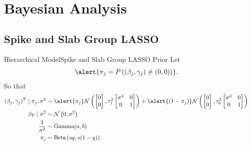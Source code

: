 \documentclass[aspectratio=169]{beamer}					%
\begin{document}
\section{Bayesian Analysis}
\subsection{Spike and Slab Group LASSO}

\begin{frame}{Hierarchical Model}{Spike and 
Slab Group LASSO Prior }
Let  
\begin{equation}
	\alert{\pi_j = P\left((\beta_j,\gamma_j)\not=(0,0)\right)}.
\end{equation}
So that
\begin{align}
	(\beta_j,\gamma_j)^T \mid \pi_{j}, \sigma^2 
        &\sim  \alert{\pi_{j}}
        \mathcal{N}\left( \begin{bmatrix}
		0 \\
		0
	\end{bmatrix}, 
	\tau_1^2\begin{bmatrix}
		\sigma^2 & 0 \\
		0 & 1
	\end{bmatrix}\right) 
        + \alert{(1-\pi_{j})} \mathcal{N}\left(\begin{bmatrix}
		0 \\
		0
	\end{bmatrix}, 
	\tau_0^2\begin{bmatrix}
		\sigma^2 & 0 \\
		0 & 1
	\end{bmatrix}\right)
	\\
	\beta_T\mid \sigma^2 &\sim \mathcal{N}\left(0, \sigma^2\right)\\
	\frac{1}{\sigma^2}&\sim \text{Gamma}(a, b)\\
	\pi_{j} &\sim\text{Beta}\left(sq, s(1-q)\right).
\end{align}
\end{frame}
\end{document}
